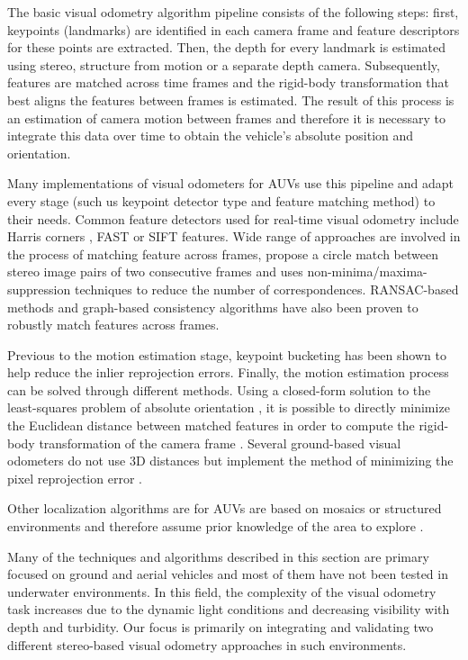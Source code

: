 \documentclass[conference]{IEEEtran}
\begin{document}
The basic visual odometry algorithm pipeline \cite{Moravec1980} consists of the following steps: first, keypoints (landmarks) are identified in each camera frame and feature descriptors for these points are extracted. Then, the depth for every landmark is estimated using stereo, structure from motion or a separate depth camera. Subsequently, features are matched across time frames and the rigid-body transformation that best aligns the features between frames is estimated. The result of this process is an estimation of camera motion between frames and therefore it is necessary to integrate this data over time to obtain the vehicle's absolute position and orientation.

Many implementations of visual odometers for AUVs use this pipeline and adapt every stage (such us keypoint detector type and feature matching method) to their needs. Common feature detectors used for real-time visual odometry include Harris corners \cite{Harris1988,Nister2006}, FAST \cite{Rosten2006,Huang2011} or SIFT \cite{Lowe2004,Botelho2009} features. Wide range of approaches are involved in the process of matching feature across frames, \cite{Geiger2011} propose a circle match between stereo image pairs of two consecutive frames and uses non-minima/maxima-suppression techniques \cite{Geiger2010} to reduce the number of correspondences. RANSAC-based methods \cite{Nister2004,Johnson2008} and graph-based consistency algorithms \cite{Howard2008} have also been proven to robustly match features across frames.

Previous to the motion estimation stage, keypoint bucketing \cite{Zhang1995} has been shown to help reduce the inlier reprojection errors. Finally, the motion estimation process can be solved through different methods. Using a closed-form solution to the least-squares problem of absolute orientation \cite{Horn1987}, it is possible to directly minimize the Euclidean distance between matched features in order to compute the rigid-body transformation of the camera frame \cite{Huang2011}. Several ground-based visual odometers do not use 3D distances but implement the method of minimizing the pixel reprojection error \cite{Howard2008,Geiger2011,Huan2011}. 

Other localization algorithms are for AUVs are based on mosaics or structured environments and therefore assume prior knowledge of the area to explore \cite{Garcia2001,Gracias2003,Carreras2003}.

Many of the techniques and algorithms described in this section are primary focused on ground and aerial vehicles and most of them have not been tested in underwater environments. In this field, the complexity of the visual odometry task increases due to the dynamic light conditions and decreasing visibility with depth and turbidity. Our focus is primarily on integrating and validating two different stereo-based visual odometry approaches in such environments.
\end{document}
